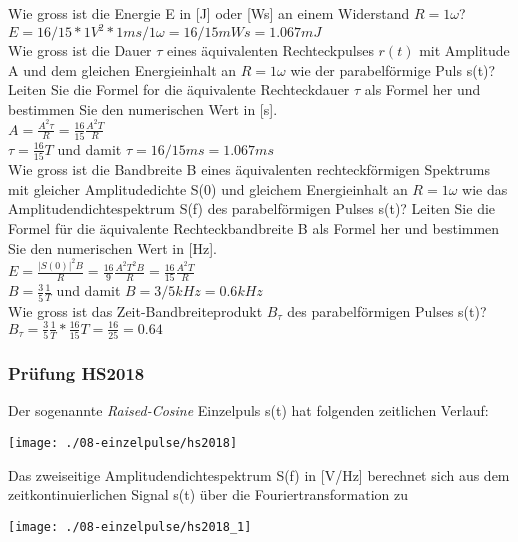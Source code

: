 Wie gross ist die Energie E in [J] oder [Ws] an einem Widerstand $R = 1 \omega$?\\
$E = 16/15 * 1 V^2 * 1ms / 1 \omega = 16/15 mWs = 1.067 mJ$\\

Wie gross ist die Dauer $\tau$ eines äquivalenten Rechteckpulses $r(t)$ mit Amplitude A und dem gleichen Energieinhalt an $R = 1 \omega$ wie der parabelförmige Puls s(t)? Leiten Sie die Formel for die äquivalente Rechteckdauer $\tau $ als Formel her und bestimmen Sie den numerischen Wert in [s].\\
$A=\frac{A^2\tau}{R}=\frac{16}{15}\frac{A^2T}{R}$\\
$\tau = \frac{16}{15}T$ und damit $\tau =16/15 ms = 1.067ms$\\

Wie gross ist die Bandbreite B eines äquivalenten rechteckförmigen Spektrums mit gleicher Amplitudedichte S(0) und gleichem Energieinhalt an $R = 1 \omega$ wie das Amplitudendichtespektrum S(f) des parabelförmigen Pulses s(t)? Leiten Sie die Formel für die äquivalente Rechteckbandbreite B als Formel her und bestimmen Sie den numerischen Wert in [Hz].\\
$E=\frac{|S(0)|^2B}{R}=\frac{16}{9}\frac{A^2T^2B}{R}=\frac{16}{15}\frac{A^2T}{R}$\\
$B=\frac{3}{5}\frac{1}{T}$ und damit $B=3/5 kHz=0.6kHz$\\

Wie gross ist das Zeit-Bandbreiteprodukt $B_{\tau }$ des parabelförmigen Pulses s(t)?\\
$B_{\tau }=\frac{3}{5}\frac{1}{T}*\frac{16}{15}T=\frac{16}{25}=0.64$

\subsubsection{Prüfung HS2018}
Der sogenannte \textit{Raised-Cosine} Einzelpuls s(t) hat folgenden zeitlichen Verlauf:
\begin{center}
    \vspace{-8pt}
    \texttt{[image: ./08-einzelpulse/hs2018]}
    \vspace{-8pt}
\end{center}

Das zweiseitige Amplitudendichtespektrum S(f) in [V/Hz] berechnet sich aus dem zeitkontinuierlichen Signal s(t) über die Fouriertransformation zu
\begin{center}
    \vspace{-8pt}
    \texttt{[image: ./08-einzelpulse/hs2018\_1]}
    \vspace{-8pt}
\end{center}


